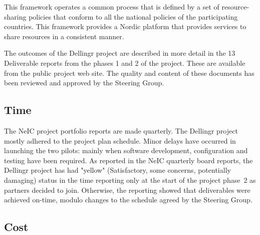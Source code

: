 \documentclass{article}
\newcommand{\dell}{Dellingr\xspace}
\begin{document}
This framework operates a common process that is defined by a set of resource-sharing policies
that conform to all the national policies of the participating countries.
This framework provides a Nordic platform that provides services to share resources
in a consistent manner.

The outcomes of the \dell project are described in more detail in the 13 Deliverable reports
from the phases 1 and 2 of the project.
These are available from the public project web site.
The quality and content of these documents has been reviewed and approved by the Steering Group.
\subsection{Time}

The NeIC project portfolio reports are made quarterly.
The \dell project mostly adhered to the project plan schedule.
Minor delays have occurred in launching the two pilots:
mainly when software development, configuration and testing  have been required.
As reported in the NeIC quarterly board reports, the \dell project has had "yellow" (Satisfactory, some concerns, potentially damaging)
status in the time reporting only at the start of the project phase~2 as partners decided to join.
Otherwise, the reporting showed that deliverables were achieved on-time, modulo changes to the schedule agreed by the Steering Group.

\subsection{Cost}
\end{document}
